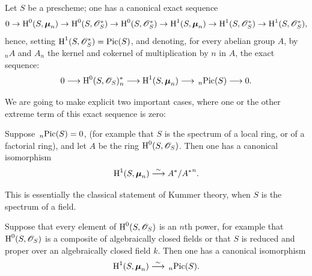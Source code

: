 \begin{proposition}
\label{XI.6.4}
Let
$S$ be a prescheme; one has a canonical exact sequence
$$
\textstyle
0\to\H^0(S,\bbmu_n)\to\H^0(S,\cal{O}^*_S)\to
\H^0(S,\cal{O}^*_S)\to\H^1(S,\bbmu_n)\to
\H^1(S,\cal{O}^*_S)\to\H^1(S,\cal{O}^*_S),
$$
hence, setting
$\H^1(S,\cal{O}_S^*)=\Pic(S)$,
and denoting, for every abelian group $A$, by ${_n}A$ and
$A_n$ the kernel and cokernel of multiplication by $n$ in $A$, the
exact sequence:
$$
0\to\H^0(S,\cal{O}_S)^*_n\to\H^1(S,\bbmu_n)\to
{\sideset{_n}{}\Pic}(S)\to 0.
$$
\end{proposition}

We are going to make explicit two important cases, where one or the other
extreme term of this exact sequence is zero:

\begin{corollary}
\label{XI.6.5} Suppose $\sideset{_n}{}\Pic(S)=0$, (for example
that $S$ is the spectrum of a local ring, or of a factorial ring),
and let $A$ be the ring $\H^0(S,\cal{O}_S)$. Then one has a canonical
isomorphism
$$
\operatorname{H}^1(S,\boldsymbol{\mu}_n)\overset{\sim}{\longrightarrow} A^*/{A^*}^n.
$$
\end{corollary}

This is essentially the classical statement of Kummer theory,
when $S$ is the spectrum of a field.

\begin{corollary}
\label{XI.6.6} Suppose that every element of
$\H^0(S,\cal{O}_S)$ is an $n$th power, for example that
$\H^0(S,\cal{O}_S)$ is a composite of algebraically
closed fields or that $S$ is reduced and proper over an
algebraically closed field $k$. Then one has a canonical isomorphism
$$
\H^1(S,\bbmu_n)\isomto\sideset{_n}{}\Pic(S).
$$
\end{corollary}

